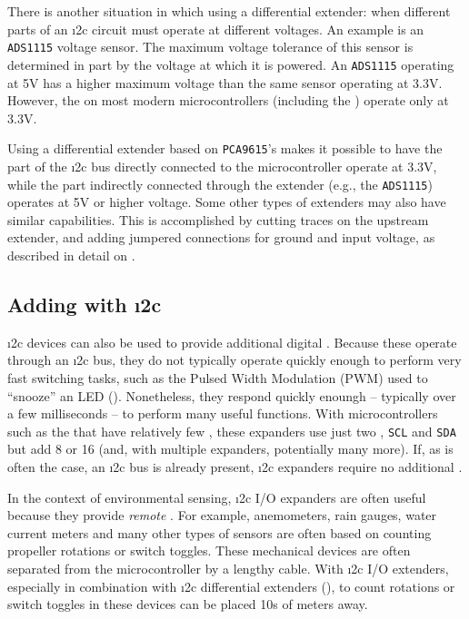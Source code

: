 \begin{kaobox}[frametitle=Potential for change \dots]
There is another situation in which using a differential extender: when different parts of an \i2c circuit must operate at different voltages.
An example is an \texttt{ADS1115} voltage sensor.
The maximum voltage tolerance of this sensor is determined in part by the voltage at which it is powered.
An \texttt{ADS1115} operating at 5V has a higher maximum voltage than the same sensor operating at 3.3V.
However, the \gpios on most modern microcontrollers (including the ) operate only at 3.3V.

Using a differential extender based on \texttt{PCA9615}'s makes it possible to have the part of the \i2c bus directly connected to the microcontroller operate at 3.3V, while the part indirectly connected through the extender (e.g., the \texttt{ADS1115}) operates at 5V or higher voltage.
Some other types of extenders may also have similar capabilities.
This is accomplished by cutting traces on the upstream extender, and adding jumpered connections for ground and input voltage, as described in detail on .
\end{kaobox}




\subsection{Adding \gpios with \i2c}
\i2c devices can also be used to provide additional digital \gpios.
Because these operate through an \i2c bus, they do not typically operate quickly enough to perform very fast switching tasks, such as the Pulsed Width Modulation (PWM) used to ``snooze'' an LED ().
Nonetheless, they respond quickly enoungh -- typically over a few milliseconds -- to perform many useful functions.
With microcontrollers such as the  that have relatively few \gpios, these expanders use just two \gpios, \texttt{SCL} and \texttt{SDA} but add 8 or 16 \gpios (and, with multiple expanders, potentially many more).
If, as is often the case, an \i2c bus is already present, \i2c expanders require no additional \gpios.

In the context of environmental sensing, \i2c I/O expanders are often useful because they provide \emph{remote} \gpios.
For example, anemometers, rain gauges, water current meters and many other types of sensors are often based on counting propeller rotations or switch toggles.
These mechanical devices are often separated from the microcontroller by a lengthy cable.
With \i2c I/O extenders, especially in combination with \i2c differential extenders (), \gpios to count rotations or switch toggles in these devices can be placed 10s of meters away.

